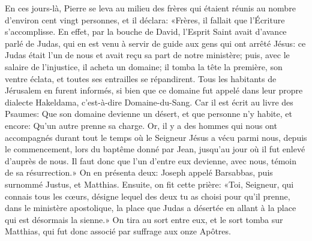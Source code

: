 En ces jours-là, Pierre se leva au milieu des frères
	qui étaient réunis au nombre d’environ cent vingt personnes, et il déclara:
	«Frères, il fallait que l’Écriture s’accomplisse.
En effet, par la bouche de David, l’Esprit Saint avait d’avance parlé de Judas,
	qui en est venu à servir de guide aux gens qui ont arrêté Jésus:
	ce Judas était l’un de nous et avait reçu sa part de notre ministère;
	puis, avec le salaire de l’injustice, il acheta un domaine;
	il tomba la tête la première, son ventre éclata,
	et toutes ses entrailles se répandirent.
Tous les habitants de Jérusalem en furent informés,
	si bien que ce domaine fut appelé dans leur propre dialecte Hakeldama,
	c’est-à-dire Domaine-du-Sang.
Car il est écrit au livre des Psaumes:
	Que son domaine devienne un désert, et que personne n’y habite,
	et encore: Qu’un autre prenne sa charge.
Or, il y a des hommes qui nous ont accompagnés
	durant tout le temps où le Seigneur Jésus a vécu parmi nous,
	depuis le commencement, lors du baptême donné par Jean,
	jusqu’au jour où il fut enlevé d’auprès de nous.
Il faut donc que l’un d’entre eux devienne, avec nous,
	témoin de sa résurrection.»
On en présenta deux:
	Joseph appelé Barsabbas, puis surnommé Justus, et Matthias.
Ensuite, on fit cette prière: «Toi, Seigneur, qui connais tous les cœurs,
	désigne lequel des deux tu as choisi
		pour qu’il prenne, dans le ministère apostolique,
	la place que Judas a désertée en allant à la place qui est désormais la sienne.»
On tira au sort entre eux, et le sort tomba sur Matthias,
	qui fut donc associé par suffrage aux onze Apôtres.

